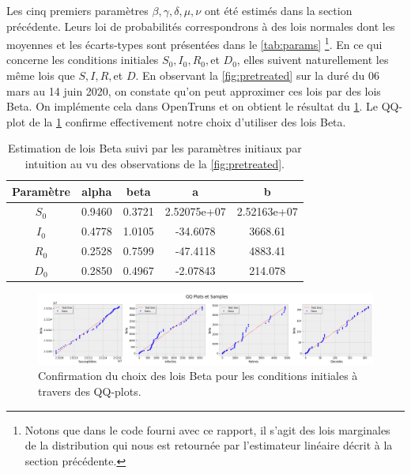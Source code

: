 \documentclass[
  french,
	10pt, %
]{fphw}
\newcommand{\tabhead}[1]{{\bfseries#1}}
\begin{document}
Les cinq premiers paramètres $\beta, \gamma, \delta, \mu, \nu$ ont été estimés dans la section précédente. Leurs loi de probabilités correspondrons à des lois normales dont les moyennes et les écarts-types sont présentées dans le \cref{tab:params} \footnote{Notons que dans le code fourni avec ce rapport, il s'agit des lois marginales de la distribution qui nous est retournée par l'estimateur linéaire décrit à la section précédente.}. En ce qui concerne les conditions initiales $S_0, I_0, R_0,$et $D_0$, elles suivent naturellement les même lois que $S, I, R,$et $D$. En observant la \cref{fig:pretreated} sur la duré du 06 mars au 14 juin 2020, on constate qu'on peut approximer ces lois par des lois Beta. On implémente cela dans OpenTruns et on obtient le résultat du \cref{tab:init}. Le QQ-plot de la \cref{fig:qqplots} confirme effectivement notre choix d'utiliser des lois Beta.
\begin{table}[h!]
  \centering
  \begin{tabular}{c c c c c}
      \toprule
      \tabhead{Paramètre} & \tabhead{alpha} & \tabhead{beta} & \tabhead{a} & \tabhead{b} \\
      \midrule
      \tabhead{$S_0$} & 0.9460 & 0.3721 & 2.52075e+07 & 2.52163e+07 \\
      \tabhead{$I_0$} & 0.4778 & 1.0105 & -34.6078 & 3668.61 \\
      \tabhead{$R_0$} & 0.2528 & 0.7599 & -47.4118 & 4883.41  \\
      \tabhead{$D_0$} & 0.2850 & 0.4967 & -2.07843 & 214.078 \\
      \bottomrule
  \end{tabular}
  \caption{Estimation de lois Beta suivi par les paramètres initiaux par intuition au vu des observations de la \cref{fig:pretreated}.}
  \label{tab:init}
\end{table}

\begin{figure}[H]
  \centering
  \includegraphics[width=\linewidth]{qqplots.png}
  \caption{Confirmation du choix des lois Beta pour les conditions initiales à travers des QQ-plots.}
  \label{fig:qqplots}
\end{figure}
\end{document}
